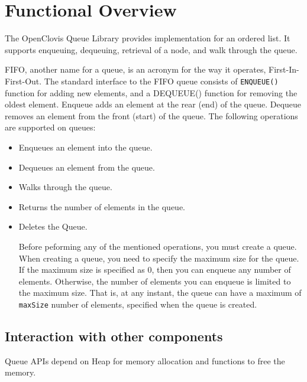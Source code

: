 \hypertarget{group__group40}{
\chapter{Functional Overview}
\label{group__group40}
}

\begin{flushleft}

The OpenClovis Queue Library provides implementation for an ordered list. It supports enqueuing, dequeuing, retrieval of a node, and 
walk through the queue. \par
 \par
 FIFO, another name for a queue, is an acronym for the way it operates, First-In-First-Out. The standard interface to the FIFO queue consists of 
 {\tt {ENQUEUE()}} function for adding new elements, and a DEQUEUE() function for removing the oldest element. Enqueue adds an element at the rear (end) of 
 the queue. Dequeue removes an element from the front (start) of the queue. The following operations are supported on queues: \par

\begin{itemize}
\item Enqueues an element into the queue. \item Dequeues an element from the queue. \item Walks through the queue. \item Returns the number of elements 
in the queue. \item Deletes the Queue. \par
 \par
 Before peforming any of the mentioned operations, you must create a queue. When creating a queue, you need to specify the maximum size for the queue. If 
 the maximum size is specified as 0, then you can enqueue any number of elements. Otherwise, the number of elements you can enqueue is limited to the 
 maximum size. That is, at any instant, the queue can have a maximum of {\tt{max\-Size}} number of elements, specified when the queue is created. \par
\end{itemize}

\section{Interaction with other components} Queue APIs depend on Heap for memory allocation and functions to free the memory. 


\end{flushleft}
